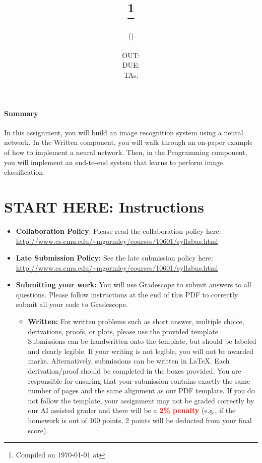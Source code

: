 \documentclass[11pt,addpoints,answers]{exam}
\date{}
\title{\textsc{\hwNum}\\
\textsc{\hwTopic}
\thanks{Compiled on \today{} at \currenttime{}}\\
\vspace{1em}
} %
\author{\textsc{\large \courseNum{} \courseName{} (\courseSem)}\\
\courseUrl
\vspace{1em}\\
  OUT: \outDate \\
  DUE: \dueDate \\
  TAs: \taNames\\
}
\date{}
\newcommand{\homeworktype}{\string written+prog}
\newcommand{\summary}{
    \begin{notebox}
        \paragraph{Summary} In this assignment, you will build an image recognition system using a neural network. In the Written component, you will walk through an on-paper example of how to implement a neural network. Then, in the Programming component, you will implement an end-to-end system that learns to perform image classification.
    \end{notebox}
}
\begin{document}
    \maketitle
    \summary{}
    
\section*{START HERE: Instructions}
\begin{itemize}
\newcommand \maxsubs {10 }

\item \textbf{Collaboration Policy}: Please read the collaboration policy here: \url{http://www.cs.cmu.edu/~mgormley/courses/10601/syllabus.html}

\item\textbf{Late Submission Policy:} See the late submission policy here: \url{http://www.cs.cmu.edu/~mgormley/courses/10601/syllabus.html}

\item\textbf{Submitting your work:} You will use Gradescope to submit
  answers to all questions\ifthenelse{\equal{\homeworktype}{\string written}}{}{ and code}. Please
  follow instructions at the end of this PDF to correctly submit all your code to Gradescope.

\begin{itemize}
    
    \item \textbf{Written:} For written problems such as short answer, multiple choice, derivations, proofs, or plots, please use the provided template. Submissions can be handwritten onto the template, but should be labeled and clearly legible. If your writing is not legible, you will not be awarded marks. Alternatively, submissions can be written in \LaTeX{}. Each derivation/proof should be completed in the boxes provided. You are responsible for ensuring that your submission contains exactly the same number of pages and the same alignment as our PDF template. If you do not follow the template, your assignment may not be graded correctly by our AI assisted grader and there will be a \textbf{\textcolor{red}{2\% penalty}} (e.g., if the homework is out of 100 points, 2 points will be deducted from your final score).


\end{itemize}
\end{itemize}
\end{document}
